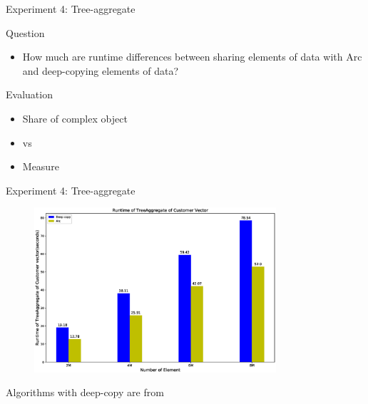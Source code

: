 \documentclass[9pt]{beamer}
\begin{document}

\begin{frame}[fragile]{Experiment 4: Tree-aggregate}

    Question
    \begin{itemize}
        \item How much are runtime differences between sharing elements of data with Arc and deep-copying elements of data?
    \end{itemize}

    Evaluation
    \begin{itemize}
        \item Share  of complex object
        \item {} vs 
        \item Measure 
    \end{itemize}

\end{frame}


\begin{frame}[fragile]{Experiment 4: Tree-aggregate}

    \begin{figure}[hp]
        \centering
        \begin{center}
                \includegraphics[width=0.8\textwidth]{images/rust_tree_aggregate.eps}
                \captionsetup{labelformat=empty}
        \end{center}
    \end{figure}
    \vspace{-.1 cm}
    Algorithms with deep-copy are from 
\end{frame}
\end{document}
